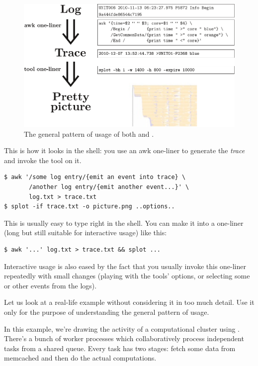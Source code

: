 \documentclass{article}
\begin{document}
\begin{figure}[t]
\center
\includegraphics[width=\textwidth]{general-usage.pdf}
\caption{The general pattern of usage of both \timeplot{} and \splot{}.}
\label{fig:general-usage}
\end{figure}

This is how it looks in the shell: you use an awk one-liner to generate the \emph{trace} and invoke the tool on it.

\begin{verbatim}
$ awk '/some log entry/{emit an event into trace} \
       /another log entry/{emit another event...}' \
       log.txt > trace.txt
$ splot -if trace.txt -o picture.png ..options..
\end{verbatim}

This is usually easy to type right in the shell. You can make it into a one-liner (long but still suitable for interactive usage) like this:

\begin{verbatim}
$ awk '...' log.txt > trace.txt && splot ...
\end{verbatim}

Interactive usage is also eased by the fact that you usually invoke this one-liner repeatedly with small changes (playing with the tools' options, or selecting some or other events from the logs).

Let us look at a real-life example without considering it in too much detail. Use it only for the purpose of understanding the general pattern of usage.

In this example, we're drawing the activity of a computational cluster using \splot{}. There's a bunch of worker processes which collaboratively process independent tasks from a shared queue. Every task has two stages: fetch some data from memcached and then do the actual computations.
\end{document}
